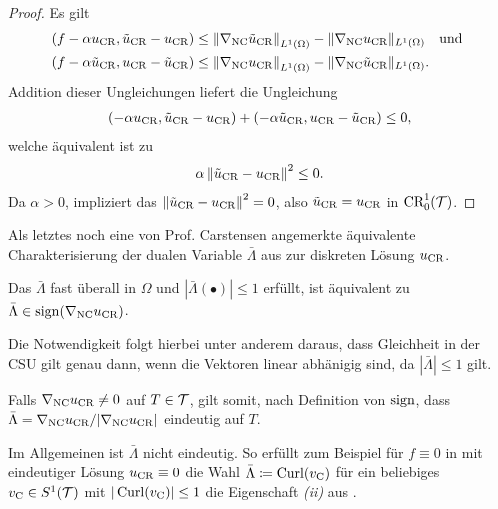 \begin{proof}
  Es gilt
  \begin{align*}
    \left(f-\alpha u_\textup{CR},\tilde{u}_{\textup{CR}}-u_\textup{CR}\right) 
    &\leq
    \left\Vert\nabla_\textup{NC}\tilde{u}_{\textup{CR}}\right\Vert_{L^1(\Omega)}
    -\Vert\nabla_\textup{NC}u_\textup{CR}\Vert_{L^1(\Omega)}\quad\text{und }\\
    \left(f-\alpha\tilde{u}_{\textup{CR}},u_\textup{CR}-\tilde{u}_{\textup{CR}}\right) 
    &\leq
    \left\Vert\nabla_\textup{NC}u_\textup{CR}\right\Vert_{L^1(\Omega)}
    -\Vert\nabla_\textup{NC}\tilde{u}_{\textup{CR}}\Vert_{L^1(\Omega)}. 
  \end{align*}
  Addition dieser Ungleichungen
  liefert die Ungleichung
  \begin{align*}
    \left(-\alpha u_\textup{CR},\tilde{u}_{\textup{CR}}-u_\textup{CR}\right) 
    + \left(-\alpha\tilde{u}_{\textup{CR}},u_\textup{CR}-\tilde{u}_{\textup{CR}}\right) 
    \leq
    0,
  \end{align*}
  welche äquivalent ist zu
  \begin{align*}
    \alpha\left\Vert\tilde{u}_{\textup{CR}}-u_\textup{CR}\right\Vert^2
    \leq
    0.
  \end{align*}
  Da $\alpha>0$, impliziert das
  $\left\Vert\tilde{u}_{\textup{CR}}-u_\textup{CR}\right\Vert^2=0$, also
  $\tilde{u}_{\textup{CR}}=u_\textup{CR}$ in $\textup{CR}^1_0(\mathcal{T})$.
\end{proof}

Als letztes noch eine von Prof. Carstensen angemerkte äquivalente 
Charakterisierung der dualen Variable $\bar\Lambda$ aus
   zur diskreten Lösung
  $u_\textup{CR}$.
\begin{remark}
  Das $\bar\Lambda$ fast überall in $\Omega$
   und
  $|\bar\Lambda(\bullet)|\leq 1$ erfüllt, ist äquivalent zu 
  $\bar\Lambda\in\operatorname{sign}(\nabla_\textup{NC} u_\textup{CR})$.   

  Die Notwendigkeit folgt hierbei unter anderem daraus, dass Gleichheit in der
  CSU gilt genau dann, wenn die Vektoren linear abhänigig sind, da
  $|\bar\Lambda|\leq 1$ gilt.

  Falls $\nabla_\textup{NC}u_\textup{CR}\neq 0$ auf $T\in\mathcal{T}$, gilt somit, nach Definition von
  $\operatorname{sign}$, dass $\bar\Lambda=\nabla_\textup{NC}u_\textup{CR}/|\nabla_\textup{NC}u_\textup{CR}|$ eindeutig auf
  $T$.

  Im Allgemeinen ist $\bar\Lambda$ nicht eindeutig. So erfüllt zum Beispiel
  für $f\equiv 0$ in  mit eindeutiger Lösung
  $u_\textup{CR}\equiv 0$ die Wahl $\bar\Lambda\coloneqq \operatorname{Curl}(v_{\textup{C}})$ für ein beliebiges
  $v_{\textup{C}}\in S^1(\mathcal{T})$ mit $|\operatorname{Curl}(v_{\textup{C}})|\leq 1$ die Eigenschaft \textit{(ii)}
  aus .
\end{remark}

